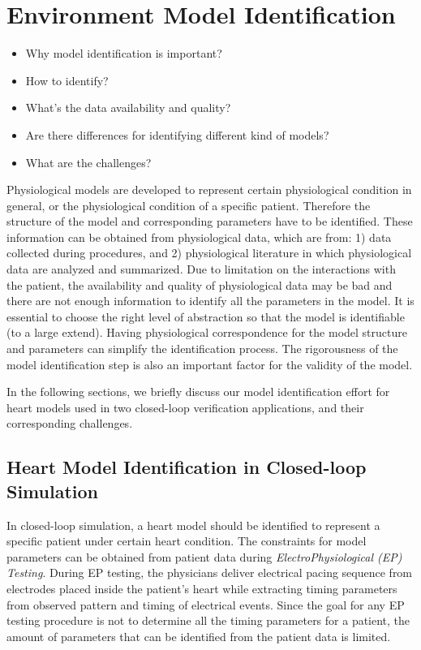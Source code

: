 \documentclass[openany]{now} %
\begin{document}
\chapter{Environment Model Identification}
\begin{itemize}
	\item Why model identification is important?
    \item How to identify?
    \item What's the data availability and quality?
    \item Are there differences for identifying different kind of models?
    \item What are the challenges?
\end{itemize}
Physiological models are developed to represent certain physiological condition in general, or the physiological condition of a specific patient. Therefore the structure of the model and corresponding parameters have to be identified. These information can be obtained from physiological data, which are from: 1) data collected during procedures, and 2) physiological literature in which physiological data are analyzed and summarized. Due to limitation on the interactions with the patient, the availability and quality of physiological data may be bad and there are not enough information to identify all the parameters in the model. It is essential to choose the right level of abstraction so that the model is identifiable (to a large extend). Having physiological correspondence for the model structure and parameters can simplify the identification process. The rigorousness of the model identification step is also an important factor for the validity of the model. 

In the following sections, we briefly discuss our model identification effort for heart models used in two closed-loop verification applications, and their corresponding challenges. 

\section{Heart Model Identification in Closed-loop Simulation}
In closed-loop simulation, a heart model should be identified to represent a specific patient under certain heart condition. The constraints for model parameters can be obtained from patient data during \emph{ElectroPhysiological (EP) Testing}. During EP testing, the physicians deliver electrical pacing sequence from electrodes placed inside the patient's heart while extracting timing parameters from observed pattern and timing of electrical events. Since the goal for any EP testing procedure is not to determine all the timing parameters for a patient, the amount of parameters that can be identified from the patient data is limited.    
\end{document}
